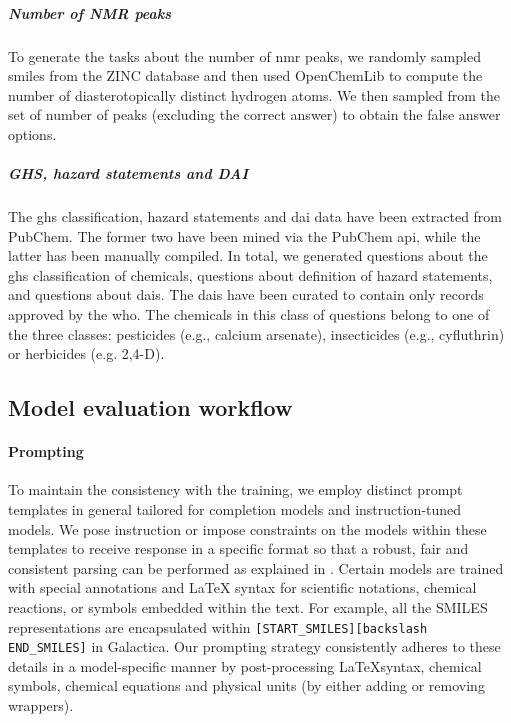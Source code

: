 \documentclass[11pt, oneside]{article}
\begin{document}
\begin{refsection}
\subparagraph{Number of NMR peaks} 
To generate the   tasks about the number of \gls{nmr} peaks, we randomly sampled \gls{smiles} from the ZINC database\autocite{Irwin_2012} and then used OpenChemLib\autocite{openchemlib} to compute the number of diasterotopically distinct hydrogen atoms. 
We then sampled from the set of number of peaks (excluding the correct answer) to obtain the false answer options.

\subparagraph{GHS, hazard statements and DAI}
The \gls{ghs} classification, hazard statements and \gls{dai} data have been extracted from PubChem.\autocite{pubchem}
The former two have been mined via the PubChem \gls{api}, while the latter has been manually compiled. 
In total, we generated  questions about the \gls{ghs} classification of chemicals,  questions about definition of hazard statements, and  questions about \glspl{dai}.
The \glspl{dai} have been curated to contain only records approved by the \gls{who}.
The chemicals in this class of questions belong to one of the three classes: pesticides (e.g., calcium arsenate), insecticides (e.g., cyfluthrin) or herbicides (e.g. 2,4-D).


\subsection{Model evaluation workflow}

\paragraph{Prompting}

To maintain the consistency with the training, we employ distinct prompt templates in general tailored for completion models and instruction-tuned models. 
We pose instruction or impose constraints on the models within these templates to receive response in a specific format so that a robust, fair and consistent parsing can be performed as explained in .
Certain models are trained with special annotations and LaTeX syntax for scientific notations, chemical reactions, or symbols embedded within the text. 
For example, all the SMILES representations are encapsulated within \texttt{[START\_SMILES][\text backslash END\_SMILES]} in Galactica\autocite{taylor2022galactica}.
Our prompting strategy consistently adheres to  these details in a model-specific manner by post-processing \LaTeX syntax, chemical symbols, chemical equations and physical units (by either adding or removing wrappers).




\end{refsection}
\end{document}
